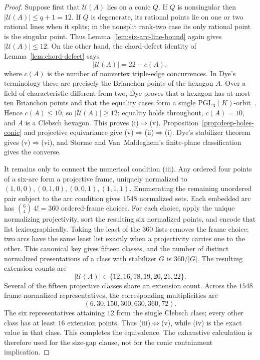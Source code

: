 \documentclass[11pt]{article}
\theoremstyle{definition}
\theoremstyle{remark}
\newcommand{\cU}{\mathcal{U}}
\begin{document}
\begin{proof}
Suppose first that $\cU(A)$ lies on a conic $Q$. If $Q$ is nonsingular then
$|\cU(A)|\le q+1=12$. If $Q$ is degenerate, its rational points lie on one
or two rational lines when it splits; in the nonsplit rank-two case its
only rational point is the singular point. Thus
Lemma~\ref{lem:six-arc-line-bound} again gives $|\cU(A)|\le12$. On the
other hand, the chord-defect identity
of Lemma~\ref{lem:chord-defect} says
\[
 |\cU(A)|=22-c(A),
\]
where $c(A)$ is the number of nonvertex triple-edge concurrences. In Dye's
terminology these are precisely the Brianchon points of the hexagon $A$.
Over a field of characteristic different from two, Dye proves that a
hexagon has at most ten Brianchon points and that the equality cases form a
single $\mathrm{PGL}_3(K)$-orbit~\cite[\S2.2--2.3, Theorem~1,
pp.~275--276]{Dye1991}. Hence $c(A)\le10$, so $|\cU(A)|\ge12$; equality
holds throughout, $c(A)=10$, and $A$ is a Clebsch hexagon. This proves
(i)$\Rightarrow$(v). Proposition~\ref{prop:deep-holes-conic} and
projective equivariance give (v)$\Rightarrow$(ii)$\Rightarrow$(i). Dye's
stabilizer theorem gives (v)$\Rightarrow$(vi), and Storme and
Van~Maldeghem's finite-plane classification gives the converse.

It remains only to connect the numerical condition (iii). Any ordered four
points of a six-arc form a projective frame, uniquely normalized to
$(1,0,0),(0,1,0),(0,0,1),(1,1,1)$. Enumerating the remaining unordered pair
subject to the arc condition gives $1548$ normalized sets. Each embedded arc
has $\binom{6}{4}\,4!=360$ ordered-frame choices. For each choice, apply the
unique normalizing projectivity, sort the resulting six normalized points,
and encode that list lexicographically. Taking the least of the $360$ lists
removes the frame choice; two arcs have the same least list exactly when a
projectivity carries one to the other. This canonical key gives fifteen
classes, and the number of distinct normalized presentations of a class
with stabilizer $G$ is $360/|G|$.
The resulting extension counts are
\[
 |\cU(A)|\in\{12,16,18,19,20,21,22\}.
\]
Several of the fifteen projective classes share an extension count. Across
the $1548$ frame-normalized representatives, the corresponding
multiplicities are
\[
 (6,30,150,300,630,360,72).
\]
The six representatives attaining $12$ form the single Clebsch class;
every other class has at least $16$ extension points. Thus
(iii)$\Leftrightarrow$(v), while (iv) is the exact value in that class.
This completes the equivalence. The exhaustive
calculation is therefore used for the size-gap clause, not for the conic
containment implication.
\end{proof}
\end{document}
